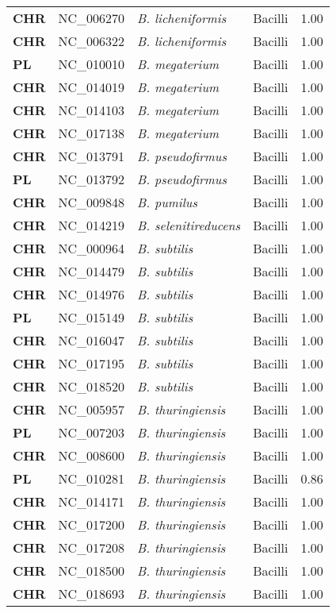 \begin{adjustwidth}{-3cm}{2cm}
{\begin{supertabular}{>{\bfseries}l|p{0.1\textwidth}p{0.14\textwidth}l|l}
CHR & NC\_006270 & \textit{B. licheniformis} & Bacilli & 1.00\\
CHR & NC\_006322 & \textit{B. licheniformis} & Bacilli & 1.00\\
PL & NC\_010010 & \textit{B. megaterium} & Bacilli & 1.00\\
CHR & NC\_014019 & \textit{B. megaterium} & Bacilli & 1.00\\
CHR & NC\_014103 & \textit{B. megaterium} & Bacilli & 1.00\\
CHR & NC\_017138 & \textit{B. megaterium} & Bacilli & 1.00\\
CHR & NC\_013791 & \textit{B. pseudofirmus} & Bacilli & 1.00\\
PL & NC\_013792 & \textit{B. pseudofirmus} & Bacilli & 1.00\\
CHR & NC\_009848 & \textit{B. pumilus} & Bacilli & 1.00\\
CHR & NC\_014219 & \textit{B. selenitireducens} & Bacilli & 1.00\\
CHR & NC\_000964 & \textit{B. subtilis} & Bacilli & 1.00\\
CHR & NC\_014479 & \textit{B. subtilis} & Bacilli & 1.00\\
CHR & NC\_014976 & \textit{B. subtilis} & Bacilli & 1.00\\
PL & NC\_015149 & \textit{B. subtilis} & Bacilli & 1.00\\
CHR & NC\_016047 & \textit{B. subtilis} & Bacilli & 1.00\\
CHR & NC\_017195 & \textit{B. subtilis} & Bacilli & 1.00\\
CHR & NC\_018520 & \textit{B. subtilis} & Bacilli & 1.00\\
CHR & NC\_005957 & \textit{B. thuringiensis} & Bacilli & 1.00\\
PL & NC\_007203 & \textit{B. thuringiensis} & Bacilli & 1.00\\
CHR & NC\_008600 & \textit{B. thuringiensis} & Bacilli & 1.00\\
PL & NC\_010281 & \textit{B. thuringiensis} & Bacilli & 0.86\\
CHR & NC\_014171 & \textit{B. thuringiensis} & Bacilli & 1.00\\
CHR & NC\_017200 & \textit{B. thuringiensis} & Bacilli & 1.00\\
CHR & NC\_017208 & \textit{B. thuringiensis} & Bacilli & 1.00\\
CHR & NC\_018500 & \textit{B. thuringiensis} & Bacilli & 1.00\\
CHR & NC\_018693 & \textit{B. thuringiensis} & Bacilli & 1.00\\

\end{supertabular}}
\end{adjustwidth}
